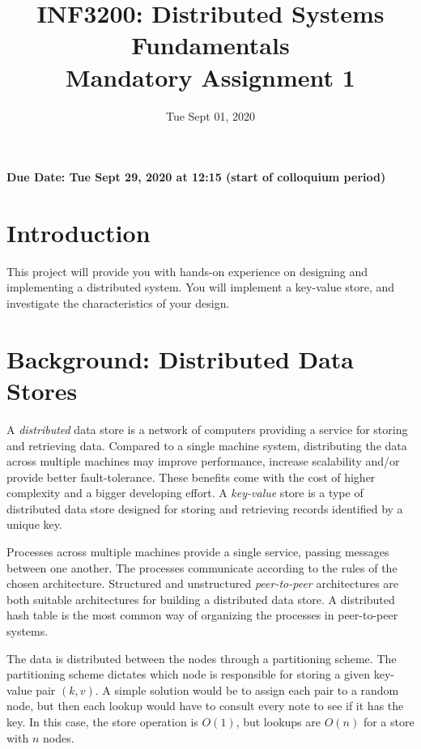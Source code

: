 \documentclass[a4paper]{article}
\title{INF3200: Distributed Systems Fundamentals \\
Mandatory Assignment 1}
\author{}
\date{Tue Sept 01, 2020}
\def\duedate{Tue Sept 29, 2020 at 12:15 (start of colloquium period)}
\begin{document}
\maketitle

%

\begin{center}
\textbf{Due Date: \duedate{}}
\end{center}

\section{Introduction}
This project will provide you with hands-on experience on designing and implementing a distributed system. You will implement a key-value store, and investigate the characteristics of your design.

\tableofcontents{}

\section{Background: Distributed Data Stores}
A \textit{distributed} data store is a network of computers providing a service for storing and retrieving data. Compared to a single machine system, distributing the data across multiple machines may improve performance, increase scalability and/or provide better fault-tolerance. These benefits come with the cost of higher complexity and a bigger developing effort. A \textit{key-value} store is a type of distributed data store designed for storing and retrieving records identified by a unique key.

Processes across multiple machines provide a single service, passing messages between one another. The processes communicate according to the rules of the chosen architecture. Structured and unstructured \textit{peer-to-peer} architectures are both suitable architectures for building a distributed data store. A distributed hash table is the most common way of organizing the processes in peer-to-peer systems.

The data is distributed between the nodes through a partitioning scheme. The partitioning scheme dictates which node is responsible for storing a given key-value pair $(k,v)$. A simple solution would be to assign each pair to a random node, but then each lookup would have to consult every note to see if it has the key.
In this case, the store operation is $O(1)$,
but lookups are $O(n)$ for a store with $n$ nodes.
\end{document}
